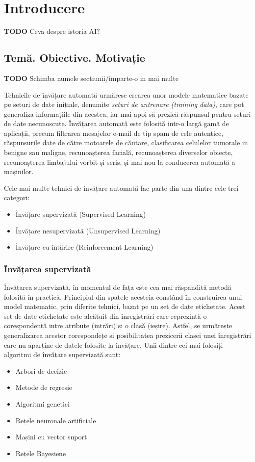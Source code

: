\chapter{Introducere}\label{ch:1intro}
\textbf{TODO} Ceva despre istoria AI?
\section{Temă. Obiective. Motivație}
\textbf{TODO} Schimba numele sectiunii/imparte-o in mai multe\newline

Tehnicile de învățare automată urmăresc crearea unor modele matematice bazate pe seturi de date inițiale, denumite \textit{seturi de antrenare (training data)}, care pot generaliza informațiile din acestea, iar mai apoi să prezică răspunsul pentru seturi de date necunoscute. Învățarea automată este folosită intr-o largă gamă de aplicații, precum filtrarea mesajelor e-mail de tip spam de cele autentice, răspunsurile date de către motoarele de căutare, clasificarea celulelor tumorale in benigne sau maligne, recunoașterea facială, recunoașterea diverselor obiecte, recunoașterea limbajului vorbit și scris, și mai nou la conducerea automată a mașinilor. 

Cele mai multe tehnici de învățare automată fac parte din una dintre cele trei categori:
\begin{itemize}
	\item Învățare supervizată (Supervised Learning)
	\item Învățare nesupervizată (Unsupervised Learning)
	\item Învățare cu întărire (Reinforcement Learning)
\end{itemize}

\subsection*{Învățarea supervizată}
Învățarea supervizată, în momentul de fața este cea mai răspandită metodă folosită în practică. Principiul din spatele acesteia constând în construirea unui model matematic, prin diferite tehnici, bazat pe un set de date etichetate. Acest set de date etichetate este alcătuit din înregistrări care reprezintă o corespondență intre atribute (intrări) si o clasă (ieșire). Astfel, se urmărește generalizarea acestor corespondețe si posibilitatea prezicerii clasei unei înregistrări care nu aparține de datele folosite la învățare. Unii dintre cei mai folosiți algoritmi de învățare supervizată sunt:
\begin{itemize}
	\item Arbori de decizie
	\item Metode de regresie
	\item Algoritmi genetici
	\item Rețele neuronale artificiale
	\item Mașini cu vector suport
	\item Rețele Bayesiene
\end{itemize}

